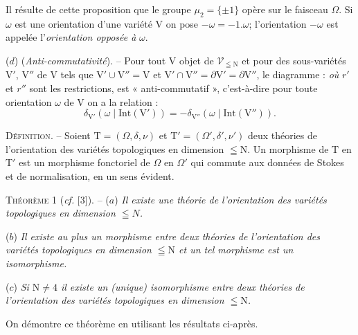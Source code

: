 Il résulte de cette proposition que le groupe $\mu_2=\{\pm1\}$ opère sur le faisceau $\Omega$. Si $\omega$ est une orientation d'une variété $\mathrm V$ on pose $-\omega=-1.\omega$; l'orientation $-\omega$ est appelée l'\textit{orientation opposée à} $\omega$.

($d$) (\textit{Anti-commutativité}). -- Pour tout $\mathrm V$ objet de $\mathcal V_{\leqq\mathrm N}$ et pour des sous-variétés $\mathrm V'$, $\mathrm V''$ de $\mathrm V$ tels que $\mathrm V'\cup\mathrm V''=\mathrm V$ et $\mathrm V'\cap\mathrm V''=\partial\mathrm V'=\partial\mathrm V''$, le diagramme :
\textit{où} $r'$ et $r''$ sont les restrictions, est « anti-commutatif », c'est-à-dire pour toute orientation $\omega$ de $\mathrm V$ on a la relation :
\[
\delta_{\mathrm V'}(\omega\mid\mathrm{Int}(\mathrm V'))=-\delta_{\mathrm V''}(\omega\mid\mathrm{Int}(\mathrm V'')).
\]

\textsc{Définition}. -- Soient $\mathrm T=(\Omega,\delta,\nu)$ et $\mathrm T'=(\Omega',\delta',\nu')$ deux théories de l'orientation des variétés topologiques en dimension $\leqq\mathrm N$. Un morphisme de $\mathrm T$ en $\mathrm T'$ est un morphisme fonctoriel de $\Omega$ en $\Omega'$ qui commute aux données de Stokes et de normalisation, en un sens évident.

\textsc{Théorème} 1 (\textit{cf.} [3]). -- ($a$) \textit{Il existe une théorie de l'orientation des variétés topologiques en dimension $\leqq N$.}

($b$) \textit{Il existe au plus \textup{un morphisme} entre deux théories de l'orientation des variétés topologiques en dimension $\leqq\mathrm N$ et un tel morphisme est un \textup{isomorphisme}.}

($c$) \textit{Si $\mathrm N\ne4$ il existe un \textup{(unique)} isomorphisme entre deux théories de l'orientation des variétés topologiques en dimension $\leqq\mathrm N$.}

On démontre ce théorème en utilisant les résultats ci-après.
